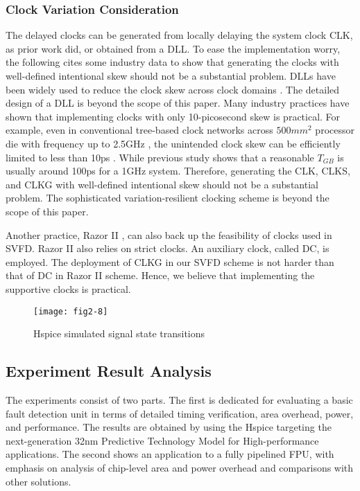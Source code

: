 \subsubsection{Clock Variation Consideration}
The delayed clocks can be generated from locally delaying the system clock CLK, as prior work \cite{agarwal2007circuit} did, or obtained from a DLL. To ease the implementation worry, the following cites some industry data to show that generating the clocks with well-defined intentional skew should not be a substantial problem. DLLs have been widely used to reduce the clock skew across clock domains \cite{clock_01}\cite{DLL_00}\cite{DLL2_04}. The detailed design of a DLL is beyond the scope of this paper. Many industry practices have shown that implementing clocks with only 10-picosecond skew is practical. For example, even in conventional tree-based clock networks across $500mm^2$ processor die with frequency up to 2.5GHz , the unintended clock skew can be efficiently limited to less than 10ps \cite{Itanium_clock05}. While previous study \cite{agarwal2007circuit} shows that a reasonable $T_{GB}$ is usually around 100ps for a 1GHz system. Therefore, generating the CLK, CLKS, and CLKG with well-defined intentional skew should not be a substantial problem. The sophisticated variation-resilient clocking scheme is beyond the scope of this paper.

Another practice, Razor II \cite{Razor2_ISSCC08}, can also back up the feasibility of clocks used in SVFD.  Razor II also relies on strict clocks. An auxiliary clock, called DC, is employed. The deployment of CLKG in our SVFD scheme is not harder than that of DC in Razor II scheme. Hence, we believe that implementing the supportive clocks is practical.


\begin{figure}
\centering
\texttt{[image: fig2-8]}
\caption{Hspice simulated signal state transitions}\label{spice}
\end{figure}


\subsection{Experiment Result Analysis}
The experiments consist of two parts. The first is dedicated for evaluating a basic fault detection unit in terms of detailed timing verification, area overhead, power, and performance. The results are obtained by using the Hspice targeting the next-generation 32nm Predictive Technology Model \cite{PTM_06} for High-performance applications.  The second shows an application to a fully pipelined FPU, with emphasis on analysis of chip-level area and power overhead and comparisons with other solutions.

